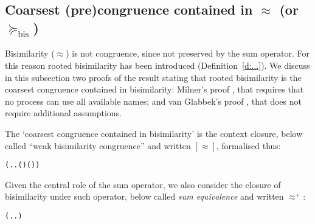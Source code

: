 
\subsection{Coarsest (pre)congruence contained in $\approx$ (or $\succeq_{\mathrm{bis}}$)}




Bisimilarity ($\approx$) is not  congruence, since not preserved by 
the sum operator. For this reason rooted bisimilarity has been
introduced (Definition~\ref{d:...}). 
We discuss in this subsection two proofs of the result stating that
rooted bisimilarity is the coarsest congruence contained in
bisimilarity: Milner's proof \cite{Milner_CCS_book}, that requires
that no process can use all available names; and van Glabbek's proof
\cite{...}, that does not require additional assumptions. 

The `coarsest congruence contained in bisimilarity' is 
the context closure, below called 
``weak bisimilarity congruence'' and written $[\approx]$, formalised thus:
\begin{alltt}
 \HOLSymConst{=}  
  \HOLSymConst{=} (\HOLTokenLambda{} . \HOLSymConst{\HOLTokenForall{}}.   \HOLSymConst{\HOLTokenImp{}}  ( ) ( ))
\end{alltt}

Given the central role of the  
 sum operator, we also consider the closure of bisimilarity under such
 operator, 
below called \emph{sum equivalence} and written $\approx^+$:
\begin{alltt}
 \HOLSymConst{=} (\HOLTokenLambda{} . \HOLSymConst{\HOLTokenForall{}}.  \HOLSymConst{+}  \HOLSymConst{\HOLTokenWeakEQ}  \HOLSymConst{+} )
\end{alltt}



